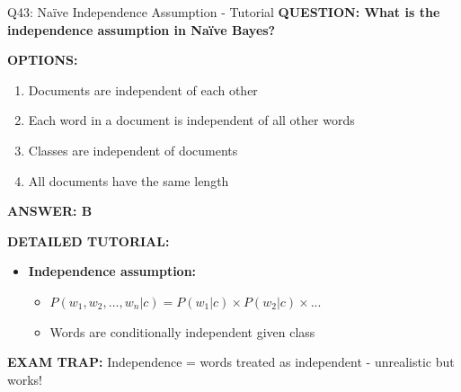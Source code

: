 \documentclass[8pt]{beamer}
\begin{document}
	\begin{frame}{Q43: Naïve Independence Assumption - Tutorial}
		\fontsize{6.5}{7.5}\selectfont
		\textbf{QUESTION: What is the independence assumption in Naïve Bayes?}
		
		\vspace{0.1cm}
		\textbf{OPTIONS:}
		\begin{enumerate}
			\item Documents are independent of each other
			\item Each word in a document is independent of all other words
			\item Classes are independent of documents
			\item All documents have the same length
		\end{enumerate}
		
		\vspace{0.1cm}
		\textcolor{myblue}{\textbf{ANSWER: B}}
		
		\vspace{0.1cm}
		\textbf{DETAILED TUTORIAL:}
		\begin{itemize}
			\item \textbf{Independence assumption:}
			\begin{itemize}
				\item $P(w_1, w_2, ..., w_n | c) = P(w_1|c) \times P(w_2|c) \times ...$
				\item Words are conditionally independent given class
			\end{itemize}
		\end{itemize}
		
		\textcolor{myred}{\textbf{EXAM TRAP:}} Independence = \textcolor{myblue}{words treated as independent} - unrealistic but works!
	\end{frame}
	
\end{document}

